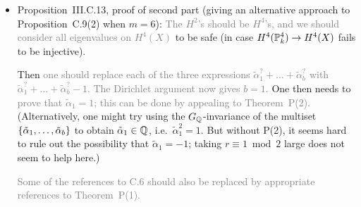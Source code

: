 \documentclass[12pt]{article}
\begin{document}
\begin{itemize}
    \item Proposition~III.C.13, proof of second part (giving an alternative approach to Proposition~C.9(2) when $m=6$):
    \textcolor{gray}{The $H^2$'s should be $H^4$'s,
    and we should consider all eigenvalues on $H^4(X)$} to be safe (in case $H^4(\mathbb{P}^4_k)\to H^4(X)$ fails to be injective).
    
    Then \textcolor{gray}{one should replace each of the three expressions $\tilde{\alpha}_1^?+\dots+\tilde{\alpha}_b^?$ with $\tilde{\alpha}_1^?+\dots+\tilde{\alpha}_b^?-1$.
    The Dirichlet argument now gives $b=1$.}
    One then needs to \textcolor{gray}{prove that $\tilde{\alpha}_1 = 1$;
    this can be done by appealing to Theorem~P(2).}
    (Alternatively, one might try using the $G_{\mathbb{Q}}$-invariance of the multiset $\{\tilde{\alpha}_1,\dots,\tilde{\alpha}_b\}$ to obtain $\tilde{\alpha}_1\in \mathbb{Q}$, i.e.~$\tilde{\alpha}_1^2 = 1$.
    But without P(2), it seems hard to rule out the possibility that $\tilde{\alpha}_1 = -1$;
    taking $r\equiv 1\bmod{2}$ large does not seem to help here.)
    
    \textcolor{gray}{Some of the references to C.6 should also be replaced by appropriate references to Theorem~P(1).}
\end{itemize}
\end{document}
